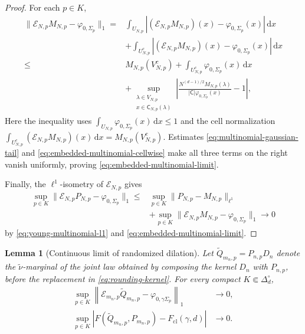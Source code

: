 \documentclass[11pt]{article}
\newtheorem{lemma}[lemma]{Lemma}
\theoremstyle{remark}
\theoremstyle{plain}
\newcommand{\dd}{\mathrm d}
\newcommand{\Fcl}{F_{\mathrm{cl}}}
\begin{document}
\begin{proof}
For each \(p\in K\),
\[
\begin{aligned}
  \|\mathcal E_{N,p}M_{N,p}-\varphi_{0,\Sigma_p}\|_1
  ={}&\int_{U_{N,p}}
      |(\mathcal E_{N,p}M_{N,p})(x)-\varphi_{0,\Sigma_p}(x)|\,\dd x\\
     &+\int_{U_{N,p}^c}
      |(\mathcal E_{N,p}M_{N,p})(x)-\varphi_{0,\Sigma_p}(x)|\,\dd x
  \\[-2pt]
  \le{}&M_{N,p}(V_{N,p}^c)
  +\int_{U_{N,p}^c}\varphi_{0,\Sigma_p}(x)\,\dd x\\
  &+\sup_{\substack{\lambda\in V_{N,p}\\
                     x\in\mathsf C_{N,p}(\lambda)}}
  \left|
  \frac{N^{(d-1)/2}M_{N,p}(\lambda)}
       {|\mathsf C|\varphi_{0,\Sigma_p}(x)}-1
  \right|,
\end{aligned}
\]
Here the inequality uses
\(\int_{U_{N,p}}\varphi_{0,\Sigma_p}(x)\,\dd x\le1\) and the cell
normalization
\(\int_{U_{N,p}^c}(\mathcal E_{N,p}M_{N,p})(x)\,\dd x
=M_{N,p}(V_{N,p}^c)\).
Estimates \eqref{eq:multinomial-gaussian-tail} and
\eqref{eq:embedded-multinomial-cellwise} make all three terms on the right
vanish uniformly, proving
\eqref{eq:embedded-multinomial-limit}.

Finally, the \(\ell^1\)-isometry of \(\mathcal E_{N,p}\) gives
\[
\begin{aligned}
  \sup_{p\in K}
  \|\mathcal E_{N,p}P_{N,p}-\varphi_{0,\Sigma_p}\|_1
  \le{}&\sup_{p\in K}\|P_{N,p}-M_{N,p}\|_{\ell^1}\\
  &+\sup_{p\in K}
    \|\mathcal E_{N,p}M_{N,p}-\varphi_{0,\Sigma_p}\|_1
  \longrightarrow0
\end{aligned}
\]
by \eqref{eq:young-multinomial-l1} and
\eqref{eq:embedded-multinomial-limit}.
\end{proof}

\begin{lemma}[Continuous limit of randomized dilation]
\label{lem:randomized-dilation}
Let \(\widetilde Q_{m_n,p}=P_{n,p}D_n\) denote the
\(\widetilde\nu\)-marginal of the joint law obtained by composing the kernel
\(D_n\) with \(P_{n,p}\), before the replacement in
\eqref{eq:rounding-kernel}.  For every compact
\(K\Subset\Delta_d^\circ\),
\begin{align}
  \sup_{p\in K}
  \left\|\mathcal E_{m_n,p}\widetilde Q_{m_n,p}
  -\varphi_{0,\gamma\Sigma_p}\right\|_1&\longrightarrow0,
  \label{eq:rounded-density-limit}\\
  \sup_{p\in K}
  \left|F(\widetilde Q_{m_n,p},P_{m_n,p})-\Fcl(\gamma,d)\right|
  &\longrightarrow0.
  \label{eq:raw-rounded-affinity}
\end{align}
\end{lemma}
\end{document}
